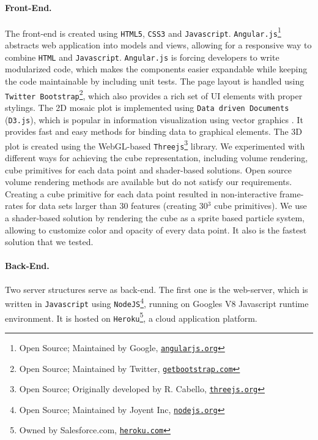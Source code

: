 \documentclass[journal]{style/vgtc} 			          %
\begin{document}
\paragraph{Front-End.}
The front-end is created using \texttt{HTML5}, \texttt{CSS3} and \texttt{Javascript}.
\texttt{Angular.js}\footnote{Open Source; Maintained by Google, \href{https://www.angularjs.org/}{\texttt{angularjs.org}}} abstracts web application into models and views, allowing for a responsive way to combine \texttt{HTML} and \texttt{Javascript}.
\texttt{Angular.js} is forcing developers to write modularized code, which makes the components easier expandable while keeping the code maintainable by including unit tests.
The page layout is handled using \texttt{Twitter Bootstrap}\footnote{Open Source; Maintained by Twitter, \href{http://getbootstrap.com}{\texttt{getbootstrap.com}}}, which also provides a rich set of UI elements with proper stylings.
The 2D mosaic plot is implemented using \texttt{Data driven Documents} (\texttt{D3.js}), which is popular in information visualization using vector graphics \cite{D3}.
It provides fast and easy methods for binding data to graphical elements.
The 3D plot is created using the WebGL-based \texttt{Threejs}\footnote{Open Source; Originally developed by R. Cabello, \href{http://threejs.org}{\texttt{threejs.org}}} library.
We experimented with different ways for achieving the cube representation, including volume rendering, cube primitives for each data point and shader-based solutions.
Open source volume rendering methods are available but do not satisfy our requirements.
Creating a cube primitive for each data point resulted in non-interactive frame-rates for data sets larger than 30 features (creating 30$^3$ cube primitives).
We use a shader-based solution by rendering the cube as a sprite based particle system, allowing to customize color and opacity of every data point.
It also is the fastest solution that we tested.

\paragraph{Back-End.}
Two server structures serve as back-end.
The first one is the web-server, which is written in \texttt{Javascript} using \texttt{NodeJS}\footnote{Open Source; Maintained by Joyent Inc, \href{http://nodejs.org}{\texttt{nodejs.org}}}, running on Googles V8 Javascript runtime environment.
It is hosted on \texttt{Heroku}\footnote{Owned by Salesforce.com, \href{https://www.heroku.com/}{\texttt{heroku.com}}}, a cloud application platform.
\end{document}
